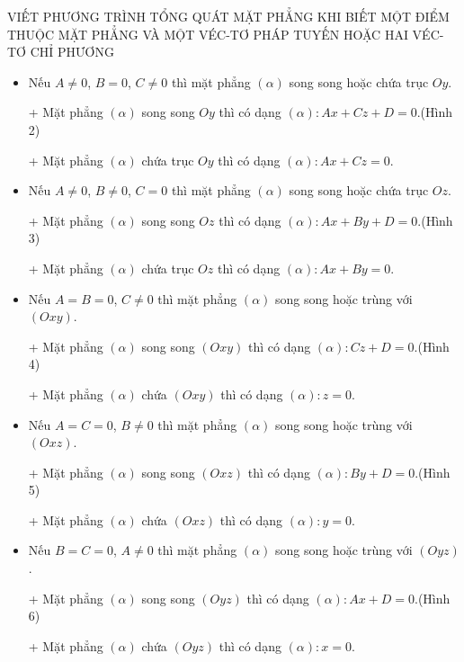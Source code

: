 \begin{dang}{VIẾT PHƯƠNG TRÌNH TỔNG QUÁT MẶT PHẲNG KHI BIẾT MỘT ĐIỂM THUỘC MẶT PHẲNG VÀ MỘT VÉC-TƠ PHÁP TUYẾN HOẶC HAI VÉC-TƠ CHỈ PHƯƠNG}
\begin{enumerate}[a.]
\begin{itemize}
			\item Nếu $A \neq 0$, $B = 0$, $C \neq 0$ thì mặt phẳng $\left(\alpha\right)$ song song hoặc chứa trục $Oy$.
			\item[+] Mặt phẳng $\left(\alpha\right)$ song song $Oy$ thì có dạng $\left(\alpha\right) \colon Ax+Cz+D=0$.(Hình 2)
			\item[+] Mặt phẳng $\left(\alpha\right)$ chứa trục $Oy$ thì có dạng $\left(\alpha\right) \colon Ax+Cz=0$.
			\item Nếu $A\neq 0$, $B \neq 0$, $C = 0$ thì mặt phẳng $\left(\alpha\right)$ song song hoặc chứa trục $Oz$.
			\item[+] Mặt phẳng $\left(\alpha\right)$ song song $Oz$ thì có dạng $\left(\alpha\right) \colon Ax+By+D=0$.(Hình 3)
			\item[+] Mặt phẳng $\left(\alpha\right)$ chứa trục $Oz$ thì có dạng $\left(\alpha\right) \colon Ax+By=0$.
			\item Nếu $A=B= 0$, $C \neq 0$ thì mặt phẳng $\left(\alpha\right)$ song song hoặc trùng với $\left(Oxy\right)$.
			\item[+] Mặt phẳng $\left(\alpha\right)$ song song $\left(Oxy\right)$ thì có dạng $\left(\alpha\right) \colon Cz+D=0$.(Hình 4)
			\item[+] Mặt phẳng $\left(\alpha\right)$ chứa $\left(Oxy\right)$ thì có dạng $\left(\alpha\right) \colon z=0$.
			\item Nếu $A=C= 0$, $B \neq 0$ thì mặt phẳng $\left(\alpha\right)$ song song hoặc trùng với $\left(Oxz\right)$.
			\item[+] Mặt phẳng $\left(\alpha\right)$ song song $\left(Oxz\right)$ thì có dạng $\left(\alpha\right) \colon By+D=0$.(Hình 5)
			\item[+] Mặt phẳng $\left(\alpha\right)$ chứa $\left(Oxz\right)$ thì có dạng $\left(\alpha\right) \colon y=0$.
			\item Nếu $B=C= 0$, $A \neq 0$ thì mặt phẳng $\left(\alpha\right)$ song song hoặc trùng với $\left(Oyz\right)$.
			\item[+] Mặt phẳng $\left(\alpha\right)$ song song $\left(Oyz\right)$ thì có dạng $\left(\alpha\right) \colon Ax+D=0$.(Hình 6)
			\item[+] Mặt phẳng $\left(\alpha\right)$ chứa $\left(Oyz\right)$ thì có dạng $\left(\alpha\right) \colon x=0$.
		\end{itemize}
		

\end{enumerate}
\end{dang}
